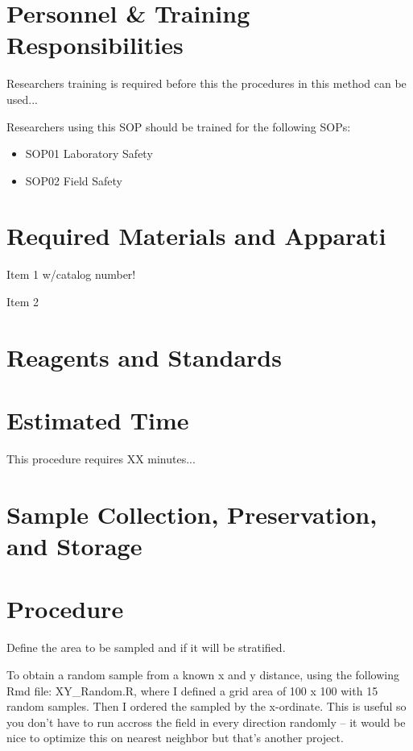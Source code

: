 \documentclass[12pt]{../SOP3_beta}\usepackage[]{graphicx}\usepackage[]{color}
\begin{document}
\section{Personnel \& Training Responsibilities}

\NP Researchers training is required before this the procedures in this method can be used... 

\NP Researchers using this SOP should be trained for the following SOPs:

\begin{itemize}
  \item SOP01 Laboratory Safety
  \item SOP02 Field Safety
\end{itemize}

\section{Required Materials and Apparati}

\NP Item 1 w/catalog number!

\NP Item 2

\section{Reagents and Standards}

\section{Estimated Time}

\NP This procedure requires XX minutes...

\section{Sample Collection, Preservation, and Storage}

\section{Procedure}

\NP Define the area to be sampled and if it will be stratified. 

\NP To obtain a random sample from a known x and y distance, using the following Rmd file: XY\_Random.R, where I defined a grid area of 100 x 100 with 15 random samples. Then I ordered the sampled by the x-ordinate. This is useful so you don't have to run accross the field in every direction randomly -- it would be nice to optimize this on nearest neighbor but that's another project.
\end{document}

